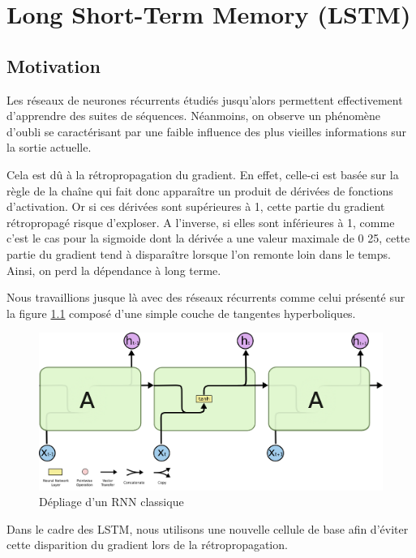 \chapter{Long Short-Term Memory (LSTM)}
\section{Motivation}
Les réseaux de neurones récurrents étudiés jusqu'alors permettent effectivement d'apprendre des suites de séquences. Néanmoins, on observe un phénomène d'oubli se caractérisant par une faible influence des plus vieilles informations sur la sortie actuelle.

Cela est dû à la rétropropagation du gradient. En effet, celle-ci est basée sur la règle de la chaîne qui fait donc apparaître un produit de dérivées de fonctions d'activation. Or si ces dérivées sont supérieures à 1, cette partie du gradient rétropropagé risque d'exploser. A l'inverse, si elles sont inférieures à 1, comme c'est le cas pour la sigmoide dont la dérivée a une valeur maximale de 0
25, cette partie du gradient tend à disparaître lorsque l'on remonte loin dans le temps. Ainsi, on perd la dépendance à long terme.

Nous travaillions jusque là avec des réseaux récurrents comme celui présenté sur la figure \ref{RNN classique} composé d'une simple couche de tangentes hyperboliques.

\begin{figure}[h!]
\begin{center}
\includegraphics[scale=0.25]{images/chapter6/RNN_classique.png}
\caption{Dépliage d'un RNN classique}
\label{RNN classique}
\end{center}
\end{figure}

Dans le cadre des LSTM, nous utilisons une nouvelle cellule de base afin d'éviter cette disparition du gradient lors de la rétropropagation.

